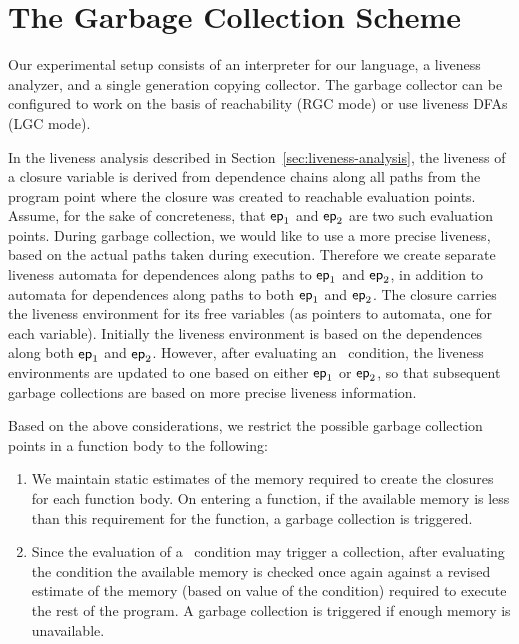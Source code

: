 \documentclass[preprint, 9pt]{sigplanconf}
\begin{document}
\section{The Garbage Collection Scheme}
\label{sec:GC-scheme}

Our experimental setup  consists of an interpreter
for  our  language,  a liveness  analyzer,  and  a
single generation copying  collector.  The garbage
collector can be configured to work on the
basis  of  reachability  (RGC  mode)  or  use  
liveness  DFAs  (LGC  mode).  

In        the       liveness        analysis       described        in
Section~\ref{sec:liveness-analysis},   the  liveness   of  a   closure
variable is  derived from dependence  chains along all paths  from the
program point  where the closure  was created to  reachable evaluation
points.  Assume,  for the  sake of  concreteness, that  $\mathsf{ep}_1$ and
$\mathsf{ep}_2$ are two such evaluation points.  During garbage collection,
we would like to use a more precise liveness, based on the actual paths
taken  during  execution.   Therefore   we  create  separate  liveness
automata for dependences  along paths to $\mathsf{ep}_1$  and $\mathsf{ep}_2$, in
addition to  automata for dependences  along paths to  both $\mathsf{ep}_1$
and $\mathsf{ep}_2$.  The closure carries  the liveness environment for its
free  variables (as  pointers  to automata,  one  for each  variable).
Initially the liveness  environment is based on  the dependences along
both  $\mathsf{ep}_1$   and  $\mathsf{ep}_2$.   However,  after   evaluating  an
\SIF\ condition, the liveness environments are updated to one based on
either   $\mathsf{ep}_1$  or   $\mathsf{ep}_2$,  so   that  subsequent   garbage
collections are based on more precise liveness information.

Based on  the above considerations,  we restrict the  possible garbage
collection points in a function body to the following:
\begin{enumerate}
\item We  maintain static estimates  of the memory required  to create
  the closures for each function body.  On entering a function, if the
  available memory is  less than this requirement for  the function, a
  garbage collection is triggered.
\item Since the evaluation of a  \SIF\ condition may trigger a 
  collection, after evaluating the condition   the available memory
  is  checked once  again against  a  revised estimate  of the  memory
  (based on  value of the condition)  required to execute the  rest of
  the program.  A garbage collection is triggered if enough memory is unavailable.
\end{enumerate}
\end{document}
